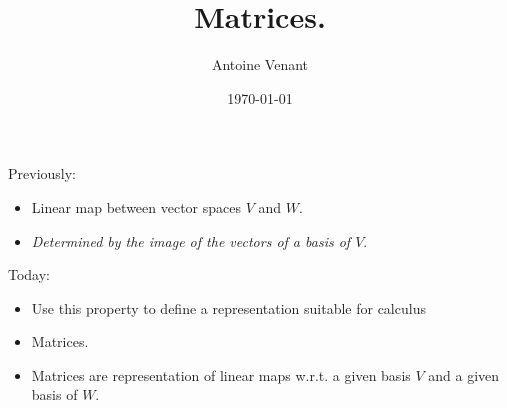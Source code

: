 \documentclass{beamer}
\newcommand{\hidden}[1]{}
\begin{document}
\title{Matrices.} 
\author{Antoine Venant}
\date{\today}
\maketitle


\begin{frame}{Previously:}
  \begin{itemize}
  \item Linear map between vector spaces $V$ and $W$.
  \item \emph{Determined by the image of the vectors of a basis of $V$}.
  \end{itemize}
\end{frame}

\begin{frame}{Today:}
  \begin{itemize}
  \item Use this property to define a representation suitable for calculus
  \item Matrices.
  \item Matrices are representation of linear maps w.r.t. a given basis $V$ and a given basis of $W$.
  \end{itemize}
\end{frame}

\hidden{
\begin{exampleblock}{Example:}
  \begin{center}
            
    \end{center}
\end{exampleblock}
}
\end{document}
